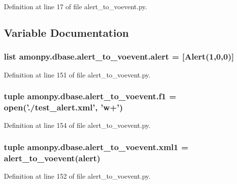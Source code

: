 Definition at line 17 of file alert\-\_\-to\-\_\-voevent.\-py.



\subsection{Variable Documentation}
\hypertarget{namespaceamonpy_1_1dbase_1_1alert__to__voevent_a8fa9f0c78d03dae7dc652c4bc5652da8}{
\subsubsection[{alert}]{\setlength{\rightskip}{0pt plus 5cm}list amonpy.\-dbase.\-alert\-\_\-to\-\_\-voevent.\-alert = \mbox{[}{\bf Alert}(1,0,0)\mbox{]}}}\label{namespaceamonpy_1_1dbase_1_1alert__to__voevent_a8fa9f0c78d03dae7dc652c4bc5652da8}


Definition at line 151 of file alert\-\_\-to\-\_\-voevent.\-py.

\hypertarget{namespaceamonpy_1_1dbase_1_1alert__to__voevent_ad2680d35f27e26465ee818742baf0e59}{
\subsubsection[{f1}]{\setlength{\rightskip}{0pt plus 5cm}tuple amonpy.\-dbase.\-alert\-\_\-to\-\_\-voevent.\-f1 = open('./test\-\_\-alert.\-xml', 'w+')}}\label{namespaceamonpy_1_1dbase_1_1alert__to__voevent_ad2680d35f27e26465ee818742baf0e59}


Definition at line 154 of file alert\-\_\-to\-\_\-voevent.\-py.

\hypertarget{namespaceamonpy_1_1dbase_1_1alert__to__voevent_acfeab88c59dadc5b1452127ffb584cdb}{
\subsubsection[{xml1}]{\setlength{\rightskip}{0pt plus 5cm}tuple amonpy.\-dbase.\-alert\-\_\-to\-\_\-voevent.\-xml1 = {\bf alert\-\_\-to\-\_\-voevent}({\bf alert})}}\label{namespaceamonpy_1_1dbase_1_1alert__to__voevent_acfeab88c59dadc5b1452127ffb584cdb}


Definition at line 152 of file alert\-\_\-to\-\_\-voevent.\-py.

